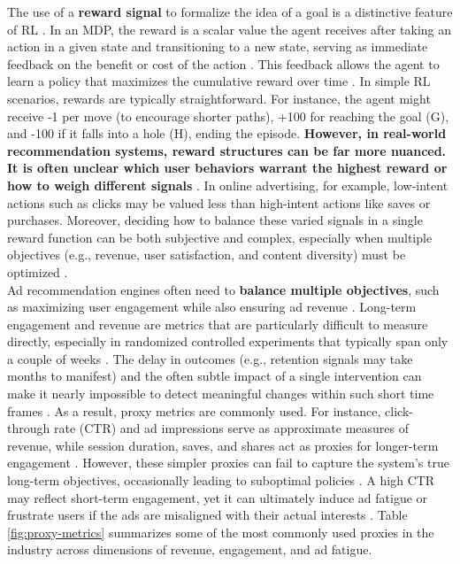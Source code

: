 \documentclass[final]{anthology-ch}         %
\begin{document}
The use of a \textbf{reward signal} to formalize the idea of a goal is a distinctive feature of RL \cite{Sutton1998}. In an MDP, the reward is a scalar value the agent receives after taking an action in a given state and transitioning to a new state, serving as immediate feedback on the benefit or cost of the action \cite{kaelbling1996reinforcement}. This feedback allows the agent to learn a policy that maximizes the cumulative reward over time \cite{kaelbling1996reinforcement}. In simple RL scenarios, rewards are typically straightforward. For instance, the agent might receive -1 per move (to encourage shorter paths), +100 for reaching the goal (G), and -100 if it falls into a hole (H), ending the episode. \textbf{However, in real-world recommendation systems, reward structures can be far more nuanced.  It is often unclear which user behaviors warrant the highest reward or how to weigh different signals} \cite{mcdonald2023spotify}. In online advertising, for example, low-intent actions such as clicks may be valued less than high-intent actions like saves or purchases. Moreover, deciding how to balance these varied signals in a single reward function can be both subjective and complex, especially when multiple objectives (e.g., revenue, user satisfaction, and content diversity) must be optimized \cite{mcdonald2023spotify}.\\

Ad recommendation engines often need to \textbf{balance multiple objectives}, such as maximizing user engagement while also ensuring ad revenue \cite{zhang2018whole, yan2020ads, sagtani2024ad}. Long-term engagement and revenue are metrics that are particularly difficult to measure directly, especially in randomized controlled experiments that typically span only a couple of weeks \cite{mcdonald2023spotify}. The delay in outcomes (e.g., retention signals may take months to manifest) and the often subtle impact of a single intervention can make it nearly impossible to detect meaningful changes within such short time frames \cite{mcdonald2023spotify}.  As a result, proxy metrics are commonly used. For instance, click-through rate (CTR) and ad impressions serve as approximate measures of revenue, while session duration, saves, and shares act as proxies for longer-term engagement \cite{wang2022surrogate}. However, these simpler proxies can fail to capture the system’s true long-term objectives, occasionally leading to suboptimal policies \cite{mazoure2021improving}. A high CTR may reflect short-term engagement, yet it can ultimately induce ad fatigue or frustrate users if the ads are misaligned with their actual interests \cite{hohnhold2015focusing, sagtani2024ad}. Table \ref{fig:proxy-metrics} summarizes some of the most commonly used proxies in the industry across dimensions of revenue, engagement, and ad fatigue. 
\end{document}
